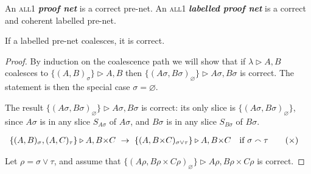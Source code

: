 \documentclass[UKenglish]{lipics-v2016}
\theoremstyle{plain}
\newcommand\defn[1]{\textit{\textbf{#1}}}
\newcommand\all{\textsc{all}}
\newcommand\+{+}
\renewcommand\*{\times}
\newcommand\net[3]{#1\triangleright #2,#3}
\newcommand\coh{\smallfrown}
\newcommand\join{\vee}
\newcommand\link[3][\sigma]{(#2,#3)_{#1}}
\newcommand\scoal{\rightarrow} %
\begin{document}
\begin{definition}
An \all1 \defn{proof net} is a correct pre-net. An \all1 \defn{labelled proof net} is a correct and coherent labelled pre-net.
\end{definition}

\begin{lemma}
If a labelled pre-net coalesces, it is correct. 
\end{lemma}

\begin{proof}
By induction on the coalescence path we will show that if $\net\lambda AB$ coalesces to $\net{\{\link AB\}}AB$ then $\net{\{\link[\varnothing]{A\sigma}{B\sigma}\}}{A\sigma}{B\sigma}$ is correct. The statement is then the special case $\sigma=\varnothing$.

The result $\net{\{\link[\varnothing]{A\sigma}{B\sigma}\}}{A\sigma}{B\sigma}$ is correct: its only slice is $\{\link[\varnothing]{A\sigma}{B\sigma}\}$, since $A\sigma$ is in any slice $S_{A\sigma}$ of $A\sigma$, and $B\sigma$ is in any slice $S_{B\sigma}$ of $B\sigma$.

\renewcommand{\+}{{+}}
\renewcommand{\*}{{\times}}
\begin{align}
	\net{\{\link AB,\link[\tau]AC\}}A{B\*C}
& ~\scoal~ 
	\net{\{\link[\sigma\join\tau]A{B\*C}\}}A{B\*C}\quad\text{if }\sigma\coh\tau
\tag{$\*$}
\end{align}

Let $\rho=\sigma\join\tau$, and assume that $\net{\{\link[\varnothing]{A\rho}{B\rho\*C\rho}\}}{A\rho}{B\rho\*C\rho}$ is correct. 

\end{proof}
\end{document}
